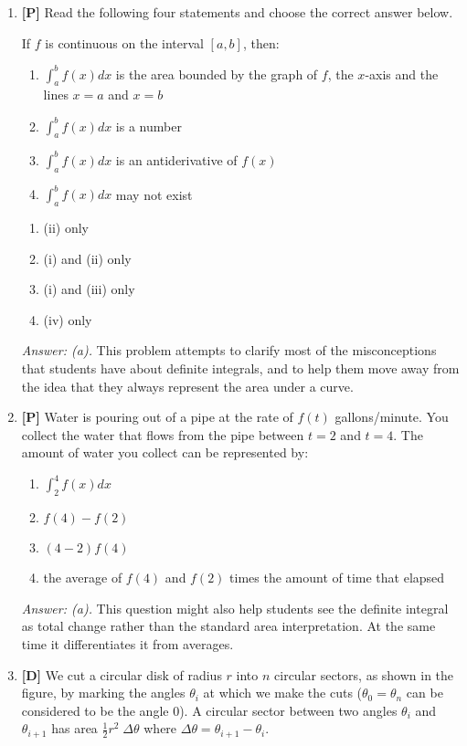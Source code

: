 \documentclass[12pt]{article}
\begin{document}
\begin{enumerate}
\bigskip

\item {\bf [P]} Read the following four statements and choose the correct
answer below.

If $f$ is continuous on  the interval $[a,b]$, then:
\renewcommand{\theenumii}{\roman{enumii}}
\begin{enumerate}
\item $\int_a^b f(x)dx$ is the area bounded by the graph of $f$, the
$x$-axis and the lines $x=a$ and $x=b$
\item $\int_a^b f(x)dx$  is a number
\item $\int_a^b f(x)dx$  is an antiderivative of $f(x)$
\item $\int_a^b f(x)dx$ may not exist
\end {enumerate}
\renewcommand{\theenumii}{\alph{enumii}}
\begin{enumerate}
\item (ii) only
\item (i) and (ii) only
\item (i) and (iii) only
\item (iv) only
\end{enumerate}

{\it Answer: (a).} This problem attempts to clarify most of the
misconceptions that students have about definite integrals, and to
help them move away from the idea that they always represent the
area under a curve. 

\bigskip

\item {\bf [P]} Water is pouring out of a pipe at the rate of $f(t)$
gallons/minute.  You collect the water that flows from the pipe
between $t=2$ and $t=4$.  The amount of water you collect can be
represented by:
\begin{enumerate}
\item $\int_2^4 f(x)dx$
\item $f(4)-f(2)$
\item $(4-2)f(4)$
\item the average of $f(4)$ and $f(2)$ times the amount of time that
elapsed
\end{enumerate}

{\it Answer: (a).} This question might also help students see
the definite integral as total change rather than the standard
area interpretation. At the same time it differentiates it from
averages. 

\bigskip

\item {\bf [D]} We cut a circular disk of radius $r$ into $n$ circular sectors,
 as shown in the figure, by marking the angles ${\theta}_i$ at
which we make the cuts (${\theta}_0 ={\theta}_n$ can be considered
to be the angle 0). A circular sector between two angles
${\theta}_i$ and ${\theta}_{i+1}$ has area $\frac{1}{2}r^2\;
\Delta\theta$ where $\Delta\theta ={\theta}_{i+1}-{\theta}_i$.


\end{enumerate}
\end{document}

